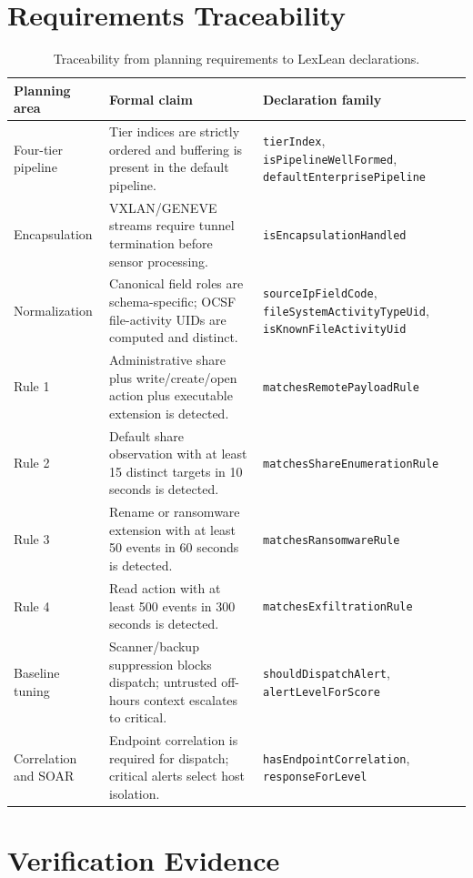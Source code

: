 \documentclass[11pt]{article}
\begin{document}
\section{Requirements Traceability}

\begin{table}[htbp]
\centering
\small
\begin{tabularx}{\textwidth}{p{3.6cm} X l}
\toprule
\textbf{Planning area} & \textbf{Formal claim} & \textbf{Declaration family} \\
\midrule
Four-tier pipeline & Tier indices are strictly ordered and buffering is present in the default
  pipeline. & \texttt{tierIndex}, \texttt{isPipelineWellFormed},
  \texttt{defaultEnterprisePipeline} \\
Encapsulation & VXLAN/GENEVE streams require tunnel termination before sensor processing. &
  \texttt{isEncapsulationHandled} \\
Normalization & Canonical field roles are schema-specific; OCSF file-activity UIDs are computed
  and distinct. & \texttt{sourceIpFieldCode}, \texttt{fileSystemActivityTypeUid},
  \texttt{isKnownFileActivityUid} \\
Rule 1 & Administrative share plus write/create/open action plus executable extension is detected. &
  \texttt{matchesRemotePayloadRule} \\
Rule 2 & Default share observation with at least 15 distinct targets in 10 seconds is detected. &
  \texttt{matchesShareEnumerationRule} \\
Rule 3 & Rename or ransomware extension with at least 50 events in 60 seconds is detected. &
  \texttt{matchesRansomwareRule} \\
Rule 4 & Read action with at least 500 events in 300 seconds is detected. &
  \texttt{matchesExfiltrationRule} \\
Baseline tuning & Scanner/backup suppression blocks dispatch; untrusted off-hours context
  escalates to critical. & \texttt{shouldDispatchAlert}, \texttt{alertLevelForScore} \\
Correlation and SOAR & Endpoint correlation is required for dispatch; critical alerts select host
  isolation. & \texttt{hasEndpointCorrelation}, \texttt{responseForLevel} \\
\bottomrule
\end{tabularx}
\caption{Traceability from planning requirements to LexLean declarations.}
\end{table}

\section{Verification Evidence}
\end{document}
